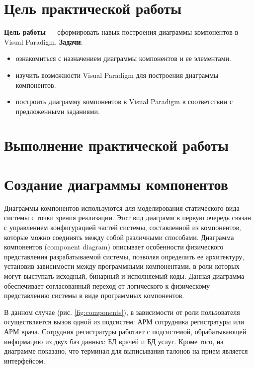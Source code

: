 \graphicspath{{./sixth/img/}} %

\section*{\LARGE Цель практической работы}

\textbf{Цель работы} --- сформировать навык построения диаграммы компонентов
в Visual Paradigm.
\textbf{Задачи}:
\begin{itemize}
	\item ознакомиться с назначением диаграммы компонентов и ее элементами.
	\item изучить возможности Visual Paradigm для построения диаграммы
		компонентов.
	\item построить диаграмму компонентов в Visual Paradigm в соответствии с
		предложенными заданиями.
\end{itemize}


\clearpage

\section*{\LARGE Выполнение практической работы}
\section{Создание диаграммы компонентов}
Диаграммы компонентов используются для моделирования статического
вида системы с точки зрения реализации. Этот вид диаграмм в первую очередь
связан с управлением конфигурацией частей системы, составленной из
компонентов, которые можно соединять между собой различными способами.
Диаграмма компонентов (component diagram) описывает особенности
физического представления разрабатываемой системы, позволяя определить ее
архитектуру, установив зависимости между программными компонентами, в
роли которых могут выступать исходный, бинарный и исполняемый коды.
Данная диаграмма обеспечивает согласованный переход от логического к
физическому представлению системы в виде программных компонентов.\par
В данном случае (рис. \ref{fig:components}), в зависимости от роли
пользователя осуществляется вызов одной из подсистем: АРМ сотрудника
регистратуры или АРМ врача. Сотрудник регистратуры работает с подсистемой,
обрабатывающей информацию из двух баз данных: БД врачей и БД услуг.
Кроме того, на диаграмме показано, что терминал для выписывания талонов
на прием является интерфейсом.

